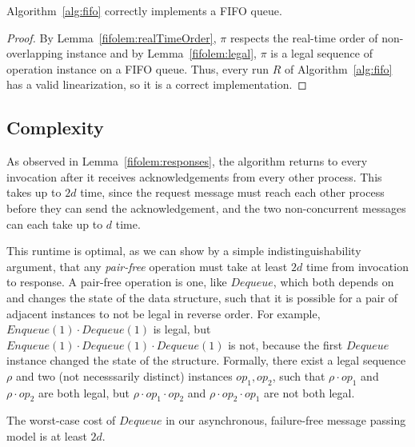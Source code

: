 \documentclass[a4paper,anonymous,USenglish]{lipics-v2021} %
\theoremstyle{definition}
\begin{document}
\begin{theorem}
  Algorithm~\ref{alg:fifo} correctly implements a FIFO queue.
\end{theorem}

\begin{proof}
  By Lemma~\ref{fifolem:realTimeOrder}, $\pi$ respects the real-time order of non-overlapping instance and by Lemma~\ref{fifolem:legal}, $\pi$ is a legal sequence of operation instance on a FIFO queue.  Thus, every run $R$ of Algorithm~\ref{alg:fifo} has a valid linearization, so it is a correct implementation.
\end{proof}
 

\subsection{Complexity}

As observed in Lemma~\ref{fifolem:responses}, the algorithm returns to every invocation after it receives acknowledgements from every other process.  This takes up to $2d$ time, since the request message must reach each other process before they can send the acknowledgement, and the two non-concurrent messages can each take up to $d$ time.

This runtime is optimal, as we can show by a simple indistinguishability argument, that any \emph{pair-free} operation must take at least $2d$ time from invocation to response.  A pair-free operation \cite{WangTalmageLeeWelch18} is one, like $Dequeue$, which both depends on and changes the state of the data structure, such that it is possible for a pair of adjacent instances to not be legal in reverse order.  For example, $Enqueue(1) \cdot Dequeue(1)$ is legal, but $Enqueue(1) \cdot Dequeue(1) \cdot Dequeue(1)$ is not, because the first $Dequeue$ instance changed the state of the structure.  Formally, there exist a legal sequence $\rho$ and two (not necesssarily distinct) instances $op_1, op_2$, such that $\rho \cdot op_1$ and $\rho \cdot op_2$ are both legal, but $\rho \cdot op_1 \cdot op_2$ and $\rho \cdot op_2 \cdot op_1$ are not both legal.

\begin{lemma}\label{fifolem:pairfreeLB}
  The worst-case cost of $Dequeue$ in our asynchronous, failure-free message passing model is at least $2d$.
\end{lemma}
\end{document}
